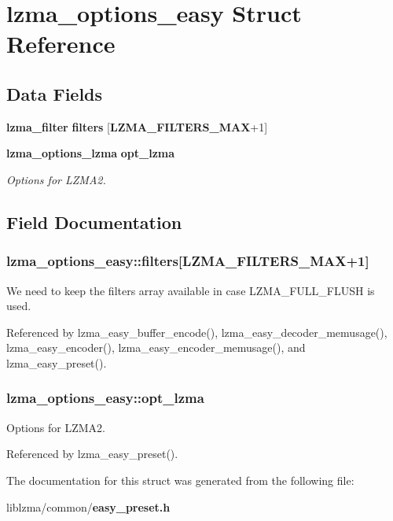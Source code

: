 \section{lzma\-\_\-options\-\_\-easy Struct Reference}
\label{structlzma__options__easy}
\subsection*{Data Fields}
\begin{DoxyCompactItemize}
\item 
{\bf lzma\-\_\-filter} {\bf filters} [{\bf L\-Z\-M\-A\-\_\-\-F\-I\-L\-T\-E\-R\-S\-\_\-\-M\-A\-X}+1]
\item 
{\bf lzma\-\_\-options\-\_\-lzma} {\bf opt\-\_\-lzma}
\begin{DoxyCompactList}\small\item\em Options for L\-Z\-M\-A2. \end{DoxyCompactList}\end{DoxyCompactItemize}


\subsection{Field Documentation}
\subsubsection[{filters}]{ lzma\-\_\-options\-\_\-easy\-::filters[{\bf L\-Z\-M\-A\-\_\-\-F\-I\-L\-T\-E\-R\-S\-\_\-\-M\-A\-X}+1]}\label{structlzma__options__easy_adb657fb0fb484aea2d4a5bc02d1edd00}
We need to keep the filters array available in case L\-Z\-M\-A\-\_\-\-F\-U\-L\-L\-\_\-\-F\-L\-U\-S\-H is used. 

Referenced by lzma\-\_\-easy\-\_\-buffer\-\_\-encode(), lzma\-\_\-easy\-\_\-decoder\-\_\-memusage(), lzma\-\_\-easy\-\_\-encoder(), lzma\-\_\-easy\-\_\-encoder\-\_\-memusage(), and lzma\-\_\-easy\-\_\-preset().

\subsubsection[{opt\-\_\-lzma}]{ lzma\-\_\-options\-\_\-easy\-::opt\-\_\-lzma}\label{structlzma__options__easy_a6f10d461b6c969f90b6be9578aa0756e}


Options for L\-Z\-M\-A2. 



Referenced by lzma\-\_\-easy\-\_\-preset().



The documentation for this struct was generated from the following file\-:\begin{DoxyCompactItemize}
\item 
liblzma/common/{\bf easy\-\_\-preset.\-h}\end{DoxyCompactItemize}
